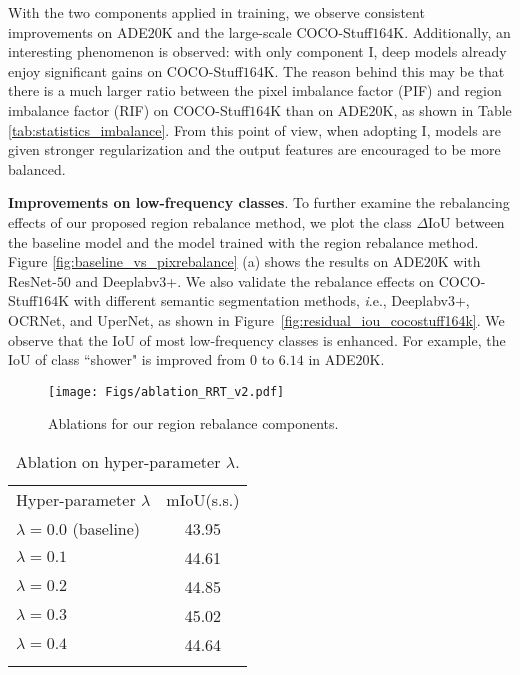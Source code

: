 \documentclass[final]{cvpr}
\begin{document}
With the two components applied in training, we observe consistent improvements on ADE$20$K and the large-scale COCO-Stuff$164$K. Additionally, an interesting phenomenon is observed: with only component I, deep models already enjoy significant gains on COCO-Stuff$164$K. The reason behind this may be that there is a much larger ratio between the pixel imbalance factor (PIF) and region imbalance factor (RIF) on COCO-Stuff$164$K than on ADE$20$K, as shown in Table \ref{tab:statistics_imbalance}. From this point of view, when adopting I, models are given stronger regularization and the output features are encouraged to be more balanced. 


\vspace{1mm}
\noindent\textbf{Improvements on low-frequency classes}.
To further examine the rebalancing effects of our proposed region rebalance method, we plot the class $\Delta \mathrm{IoU}$ between the baseline model and the model trained with the region rebalance method. Figure \ref{fig:baseline_vs_pixrebalance} (a) shows the results on ADE$20$K with ResNet-$50$ and Deeplabv$3$+. We also validate the rebalance effects on COCO-Stuff$164$K with different semantic segmentation methods, {\textit i.e.}, Deeplabv$3$+, OCRNet, and UperNet, as shown in Figure~\ref{fig:residual_iou_cocostuff164k}. We observe that the $\mathrm{IoU}$ of most low-frequency classes is enhanced. For example, the $\mathrm{IoU}$ of class ``shower" is improved from $0$ to $6.14$ in ADE$20$K.


\begin{figure}[t]
\centering
\texttt{[image: Figs/ablation\_RRT\_v2.pdf]}
\caption{Ablations for our region rebalance components.}
\label{fig:ablation_RRT}
\vspace{-0.1in}
\end{figure}


\begin{table}[t]
	\centering
	\setlength{\tabcolsep}{24pt}
	\caption{Ablation on hyper-parameter $\lambda$.}
	\label{tab:ablation_lamda}
	{
		\begin{tabular}{l|c}
			\shline
			Hyper-parameter $\lambda$  &$\mathrm{mIoU}$(s.s.) \\
			\shline
			$\lambda=0.0$ (baseline) &43.95 \\
			\shline
            $\lambda=0.1$  &44.61\\
            $\lambda=0.2$  &44.85\\
            $\lambda=0.3$  &45.02\\
            $\lambda=0.4$  &44.64\\
			\shline
		\end{tabular}
	}
	\vspace{-0.15in}
\end{table}
\end{document}
